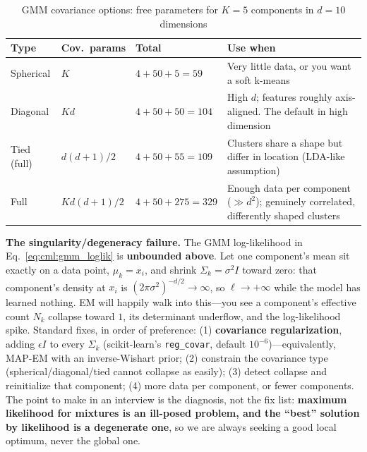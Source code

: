 \begin{table}[H]
\centering
\small
\caption{GMM covariance options: free parameters for $K=5$ components in $d=10$ dimensions}
\label{cml:tab:gmm_cov}
\begin{tabularx}{\textwidth}{@{}l l l X@{}}
\toprule
\textbf{Type} & \textbf{Cov.\ params} & \textbf{Total} & \textbf{Use when} \\
\midrule
Spherical & $K$ & $4 + 50 + 5 = 59$ & Very little data, or you want a soft k-means \\
Diagonal & $Kd$ & $4 + 50 + 50 = 104$ & High $d$; features roughly axis-aligned. The default in high dimension \\
Tied (full) & $d(d+1)/2$ & $4 + 50 + 55 = 109$ & Clusters share a shape but differ in location (LDA-like assumption) \\
Full & $K d(d+1)/2$ & $4 + 50 + 275 = 329$ & Enough data per component ($\gg d^2$); genuinely correlated, differently shaped clusters \\
\bottomrule
\end{tabularx}
\end{table}

\begin{warningbox}
\textbf{The singularity/degeneracy failure.} The GMM log-likelihood in Eq.~\eqref{eq:cml:gmm_loglik} is \textbf{unbounded above}. Let one component's mean sit exactly on a data point, $\mu_k = x_i$, and shrink $\Sigma_k = \sigma^2 I$ toward zero: that component's density at $x_i$ is $(2\pi\sigma^2)^{-d/2} \to \infty$, so $\ell \to +\infty$ while the model has learned nothing. EM will happily walk into this---you see a component's effective count $N_k$ collapse toward $1$, its determinant underflow, and the log-likelihood spike. Standard fixes, in order of preference: (1) \textbf{covariance regularization}, adding $\epsilon I$ to every $\Sigma_k$ (scikit-learn's \texttt{reg\_covar}, default $10^{-6}$)---equivalently, MAP-EM with an inverse-Wishart prior; (2) constrain the covariance type (spherical/diagonal/tied cannot collapse as easily); (3) detect collapse and reinitialize that component; (4) more data per component, or fewer components. The point to make in an interview is the diagnosis, not the fix list: \textbf{maximum likelihood for mixtures is an ill-posed problem, and the ``best'' solution by likelihood is a degenerate one}, so we are always seeking a good local optimum, never the global one.
\end{warningbox}

